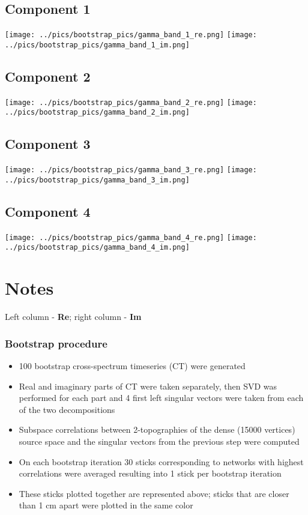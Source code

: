 \documentclass{article}
\begin{document}
\subsection*{Component 1}
\texttt{[image: ../pics/bootstrap\_pics/gamma\_band\_1\_re.png]}
\hspace{2cm}
\texttt{[image: ../pics/bootstrap\_pics/gamma\_band\_1\_im.png]}

\subsection*{Component 2}
\texttt{[image: ../pics/bootstrap\_pics/gamma\_band\_2\_re.png]}
\hspace{2cm}
\texttt{[image: ../pics/bootstrap\_pics/gamma\_band\_2\_im.png]}

\subsection*{Component 3}
\texttt{[image: ../pics/bootstrap\_pics/gamma\_band\_3\_re.png]}
\hspace{2cm}
\texttt{[image: ../pics/bootstrap\_pics/gamma\_band\_3\_im.png]}

\subsection*{Component 4}
\texttt{[image: ../pics/bootstrap\_pics/gamma\_band\_4\_re.png]}
\hspace{2cm}
\texttt{[image: ../pics/bootstrap\_pics/gamma\_band\_4\_im.png]}


\justify
\section{Notes}
Left column - \textbf{Re}; right column - \textbf{Im}

\subsubsection{Bootstrap procedure}
\begin{itemize}
    \item 100 bootstrap cross-spectrum timeseries (CT) were generated
    \item Real and imaginary parts of CT were taken separately, then
          SVD was performed for each part and 4 first left singular vectors were taken
          from each of the two decompositions
    \item Subspace correlations between 2-topographies of the dense (15000 vertices)
          source space and the singular vectors from the previous step were computed
    \item On each bootstrap iteration 30 sticks corresponding to networks 
          with highest correlations were averaged resulting into 1 stick per bootstrap iteration
    \item These sticks plotted together are represented above;
          sticks that are closer than 1 cm apart were plotted in the same color
\end{itemize}
\end{document}
